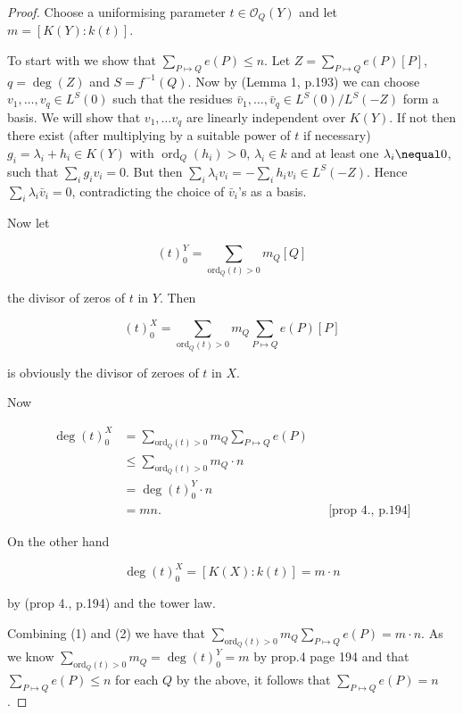 \documentclass[11pt]{article} %
\DeclareMathOperator{\ord}{ord}
\begin{document}
\begin{proof}

	Choose a uniformising parameter $t\in \mathscr{O}_{Q}(Y)$ and let $m=[K(Y):k(t)]$.

	To start with we show that $\sum_{P\mapsto Q} e(P)\leq n$. Let $Z=\sum_{P\mapsto Q}e(P)[P]$, $q=\deg (Z)$ 		and $S=f^{-1}(Q)$. Now by (Lemma 1, p.193) we can choose $v_{1},\ldots ,v_{q}\in L^{S}(0)$ such that the 			residues $\bar{v}_{1},\ldots ,\bar{v}_{q}\in L^{S}(0)/L^{S}(-Z)$ form a basis. We will show that $v_{1},			\ldots v_{q}$ are linearly independent over $K(Y)$. If not then there exist (after multiplying by a suitable power 		of $t$ if necessary) $g_{i}=\lambda_{i} +h_{i}\in K(Y)$ with $\ord_{Q}(h_{i})>0$, $\lambda_{i}\in k$ and 			at least one $\lambda_{i}\nequal 0$, such that $\sum_{i}g_{i}v_{i}=0$. But then 							$\sum_{i}\lambda_{i}v_{i}=-\sum_{i}h_{i}v_{i}\in L^{S}(-Z)$. Hence $\sum_{i}\lambda_{i}\bar{v}_{i}=0$, 			contradicting the choice of $\bar{v}_{i}$'s as a basis.
	
	

	Now let

		\[
			(t)_{0}^{Y}=\sum_{\textrm{ord}_{Q}(t)>0}m_{Q}[Q]
		\]

	 the divisor of zeros of $t$ in $Y$. Then

		\[
			(t)_{0}^{X}=\sum_{\textrm{ord}_{Q}(t)>0}m_{Q} \sum_{P\mapsto Q}e(P)[P]
		\]

	is obviously the divisor of zeroes of $t$ in $X$.

	Now

		\begin{align}
			\deg(t)_{0}^{X} & = \sum_{\textrm{ord}_{Q}(t)>0}m_{Q} \sum_{P\mapsto Q}e(P) \nonumber \\
			& \leq \sum_{\textrm{ord}_{Q}(t)>0}m_{Q} \cdot n \nonumber \\
			& = \deg(t)_{0}^{Y}\cdot n \nonumber \\
			& = mn. && \mbox{[prop 4., p.194]}
		\end{align}

	On the other hand

		\begin{equation}
			\deg(t)_{0}^{X}=[K(X):k(t)]=m\cdot n
		\end{equation}

	by (prop 4., p.194) and the tower law.

	Combining (1) and (2) we have that $\sum_{\textrm{ord}_{Q}(t)>0}m_{Q} \sum_{P\mapsto Q}e(P)=m\cdot n$.		As we know $\sum_{\textrm{ord}_{Q}(t)>0}m_{Q}=\deg(t)_{0}^{Y}=m$ by prop.4 page 194 and that 			$\sum_{P\mapsto Q}e(P)\leq n$ for each $Q$ by the above, it follows that $\sum_{P\mapsto Q} e(P)=n$. 

\end{proof}
\end{document}
